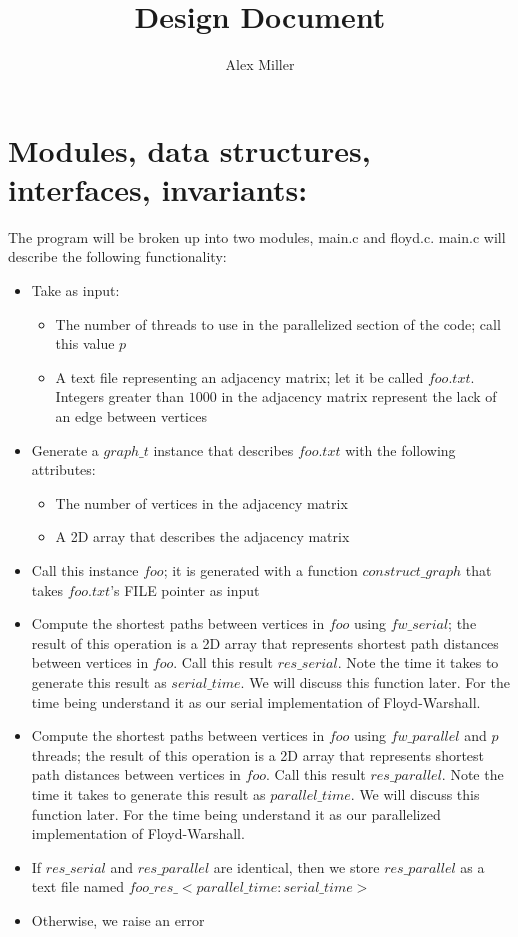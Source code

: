 \documentclass[]{article}
\title{Design Document}
\author{Alex Miller}
\begin{document}
	\maketitle
	
\section{Modules, data structures, interfaces, invariants:}
The program will be broken up into two modules, main.c and floyd.c. main.c will describe the following functionality:
\begin{itemize}
	\item Take as input:
	\begin{itemize}
		\item The number of threads to use in the parallelized section of the code; call this value $p$
		\item A text file representing an adjacency matrix; let it be called $foo.txt$. Integers greater than $1000$ in the adjacency matrix represent the lack of an edge between vertices
	\end{itemize}
	\item Generate a $graph\_t$ instance that describes $foo.txt$ with the following attributes:
	\begin{itemize}
		\item The number of vertices in the adjacency matrix
		\item A 2D array that describes the adjacency matrix
	\end{itemize}
	\item Call this instance $foo$; it is generated with a function $construct\_graph$ that takes $foo.txt$'s FILE pointer as input
	\item Compute the shortest paths between vertices in $foo$ using $fw\_serial$; the result of this operation is a 2D array that represents shortest path distances between vertices in $foo$. Call this result $res\_serial$. Note the time it takes to generate this result as $serial\_time$. We will discuss this function later.  For the time being understand it as our serial implementation of Floyd-Warshall.
	\item Compute the shortest paths between vertices in $foo$ using $fw\_parallel$ and $p$ threads; the result of this operation is a 2D array that represents shortest path distances between vertices in $foo$. Call this result $res\_parallel$. Note the time it takes to generate this result as $parallel\_time$. We will discuss this function later. For the time being understand it as our parallelized implementation of Floyd-Warshall.
	\item If $res\_serial$ and $res\_parallel$ are identical, then we store $res\_parallel$ as a text file named $foo\_res\_<parallel\_time:serial\_time>$
	\item Otherwise, we raise an error
	
\end{itemize}
\end{document}
